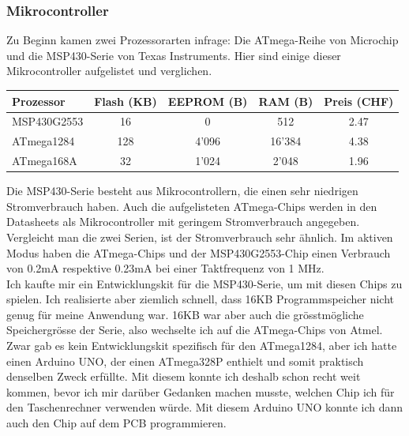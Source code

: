\documentclass[12pt, a4paper]{report}
\begin{document}
\subsubsection{Mikrocontroller}
Zu Beginn kamen zwei Prozessorarten infrage: Die ATmega-Reihe von Microchip und die MSP430-Serie von Texas Instruments. Hier sind einige dieser Mikrocontroller aufgelistet und verglichen.
\begin{table}[H]
\begin{tabular}{|l|c|c|c|c|}
\hline
\textbf{Prozessor} & \textbf{Flash (KB)} & \textbf{EEPROM (B)} & \textbf{RAM (B)} & \textbf{Preis (CHF)} \footnotemark \\
\hline
MSP430G2553 & 16 & 0 & 512 & 2.47 \\
\hline
ATmega1284 & 128 & 4'096 & 16'384 & 4.38 \\
\hline
ATmega168A & 32 & 1'024 & 2'048 & 1.96 \\
\hline
\end{tabular}
\end{table}
\noindent
Die MSP430-Serie besteht aus Mikrocontrollern, die einen sehr niedrigen Stromverbrauch haben. Auch die aufgelisteten ATmega-Chips werden in den Datasheets als Mikrocontroller mit geringem Stromverbrauch angegeben. Vergleicht man die zwei Serien, ist der Stromverbrauch sehr ähnlich. Im aktiven Modus haben die ATmega-Chips und der MSP430G2553-Chip einen Verbrauch von 0.2mA respektive 0.23mA bei einer Taktfrequenz von 1 MHz.
\\[\medskipamount]
Ich kaufte mir ein Entwicklungskit für die MSP430-Serie, um mit diesen Chips zu spielen. Ich realisierte aber ziemlich schnell, dass 16KB Programmspeicher nicht genug für meine Anwendung war. 16KB war aber auch die grösstmögliche Speichergrösse der Serie, also wechselte ich auf die ATmega-Chips von Atmel.
\\[\medskipamount]
Zwar gab es kein Entwicklungskit spezifisch für den ATmega1284, aber ich hatte einen Arduino UNO, der einen ATmega328P enthielt und somit praktisch denselben Zweck erfüllte. Mit diesem konnte ich deshalb schon recht weit kommen, bevor ich mir darüber Gedanken machen musste, welchen Chip ich für den Taschenrechner verwenden würde. Mit diesem Arduino UNO konnte ich dann auch den Chip auf dem PCB programmieren.
\end{document}
